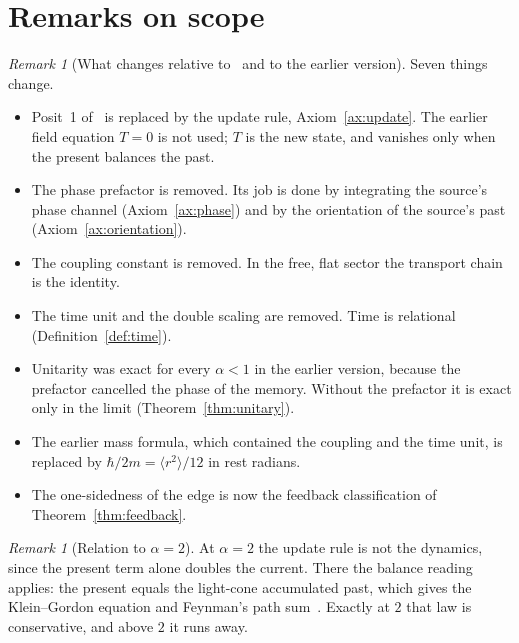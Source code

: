 \documentclass[11pt]{amsart}
\theoremstyle{definition}
\theoremstyle{remark}
\newtheorem{remark}[theorem]{Remark}
\begin{document}
\clearpage
\section{Remarks on scope}

\begin{remark}[What changes relative to~\cite{Skeleton} and to the earlier version]
Seven things change.
\begin{itemize}
\item Posit~1 of~\cite{Skeleton} is replaced by the update rule, Axiom~\ref{ax:update}. The earlier field equation $T=0$ is not used; $T$ is the new state, and vanishes only when the present balances the past.
\item The phase prefactor is removed. Its job is done by integrating the source's phase channel (Axiom~\ref{ax:phase}) and by the orientation of the source's past (Axiom~\ref{ax:orientation}).
\item The coupling constant is removed. In the free, flat sector the transport chain is the identity.
\item The time unit and the double scaling are removed. Time is relational (Definition~\ref{def:time}).
\item Unitarity was exact for every $\alpha<1$ in the earlier version, because the prefactor cancelled the phase of the memory. Without the prefactor it is exact only in the limit (Theorem~\ref{thm:unitary}).
\item The earlier mass formula, which contained the coupling and the time unit, is replaced by $\hbar/2m=\langle r^2\rangle/12$ in rest radians.
\item The one-sidedness of the edge is now the feedback classification of Theorem~\ref{thm:feedback}.
\end{itemize}
\end{remark}

\begin{remark}[Relation to $\alpha=2$]
At $\alpha=2$ the update rule is not the dynamics, since the present term alone doubles the current. There the balance reading applies: the present equals the light-cone accumulated past, which gives the Klein--Gordon equation and Feynman's path sum~\cite{Alpha2}. Exactly at $2$ that law is conservative, and above $2$ it runs away.
\end{remark}
\end{document}
